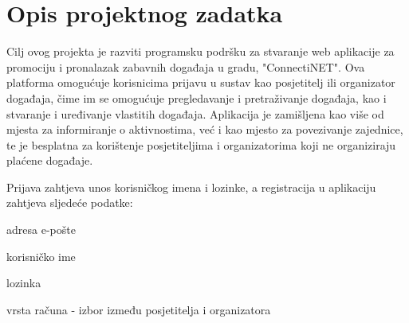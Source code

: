 \chapter{Opis projektnog zadatka}
		
		
		
		Cilj ovog projekta je razviti programsku podršku za stvaranje web aplikacije za promociju i pronalazak zabavnih događaja u gradu, "ConnectiNET". Ova platforma omogućuje korisnicima prijavu u sustav kao posjetitelj ili organizator događaja, čime im se omogućuje pregledavanje i pretraživanje događaja, kao i stvaranje i uređivanje vlastitih događaja. Aplikacija je zamišljena kao više od mjesta za informiranje o aktivnostima, već i kao mjesto za povezivanje zajednice, te je besplatna za korištenje posjetiteljima i organizatorima koji ne organiziraju plaćene događaje.
		
		Prijava zahtjeva unos korisničkog imena i lozinke, a registracija u aplikaciju zahtjeva sljedeće podatke:
		 \begin{packed_item}
			\item adresa e-pošte
		 	\item korisničko ime
			\item lozinka
			\item vrsta računa - izbor između posjetitelja i organizatora
		 \end{packed_item}	

